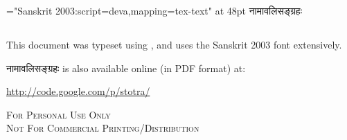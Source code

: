\thispagestyle{empty}

\begin{titlepage}
\vspace*{6.5cm}\centerline{\font\x="Sanskrit 2003:script=deva,mapping=tex-text" at 48pt \x नामावलिसङ्ग्रहः}
\end{titlepage}
\vspace*{5cm}
\begin{center}

\parbox{10cm}{\subsection*{}
\noindent {} This document was typeset using \XeLaTeX, and uses the Sanskrit 2003 font extensively.


\begin{center}
{ नामावलिसङ्ग्रहः} is also available online (in PDF format) at: 

\url{http://code.google.com/p/stotra/}




\vspace*{1cm}

{\scshape{For Personal Use Only\\
 Not For Commercial Printing/Distribution}}
\end{center}
}
\end{center}
\clearemptydoublepage
\setcounter{page}{0}
\renewcommand{\chaptermark}[1]{%
\markboth{#1}{}}
\begin{center}
\begin{large}
\tableofcontents
\end{large}
\end{center}

\mbox{}
\clearpage
